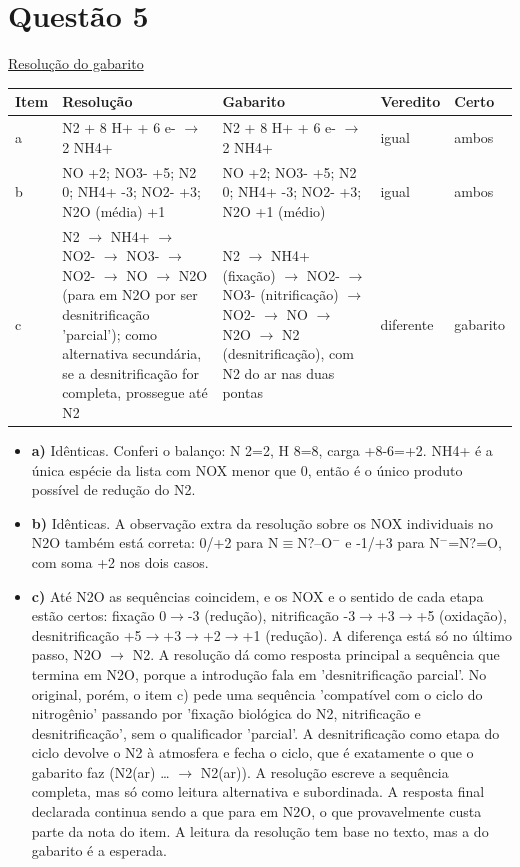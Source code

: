 \documentclass{article}%
\begin{document}
\section*{Questão 5}%
\href{https://poliedroresolve.sistemapoliedro.com.br/vestibulares/ita/2027/ita-2-fase-dia-2-21-10-2026-2-fase-dia-2/dissertativa-5-quimica-2-fase-dia-2-ita-2027}{Resolução do gabarito}\par\smallskip%
\begin{longtable}{@{}p{} p{} p{} p{} p{}@{}}\toprule Item & Resolução & Gabarito & Veredito & Certo \\ \midrule
a & N2 + 8 H+ + 6 e- $\to$ 2 NH4+ & N2 + 8 H+ + 6 e- $\to$ 2 NH4+ & igual & ambos \\
b & NO +2; NO3- +5; N2 0; NH4+ -3; NO2- +3; N2O (média) +1 & NO +2; NO3- +5; N2 0; NH4+ -3; NO2- +3; N2O +1 (médio) & igual & ambos \\
c & N2 $\to$ NH4+ $\to$ NO2- $\to$ NO3- $\to$ NO2- $\to$ NO $\to$ N2O (para em N2O por ser desnitrificação 'parcial'); como alternativa secundária, se a desnitrificação for completa, prossegue até N2 & N2 $\to$ NH4+ (fixação) $\to$ NO2- $\to$ NO3- (nitrificação) $\to$ NO2- $\to$ NO $\to$ N2O $\to$ N2 (desnitrificação), com N2 do ar nas duas pontas & diferente & gabarito \\
\bottomrule\end{longtable}%
\begin{itemize}%
\item%
\textbf{a)} Idênticas. Conferi o balanço: N 2=2, H 8=8, carga +8-6=+2. NH4+ é a única espécie da lista com NOX menor que 0, então é o único produto possível de redução do N2.%
\item%
\textbf{b)} Idênticas. A observação extra da resolução sobre os NOX individuais no N2O também está correta: 0/+2 para N$\equiv$N?--O$^{-}$ e -1/+3 para N$^{-}$=N?=O, com soma +2 nos dois casos.%
\item%
\textbf{c)} Até N2O as sequências coincidem, e os NOX e o sentido de cada etapa estão certos: fixação 0$\to$-3 (redução), nitrificação -3$\to$+3$\to$+5 (oxidação), desnitrificação +5$\to$+3$\to$+2$\to$+1 (redução). A diferença está só no último passo, N2O $\to$ N2. A resolução dá como resposta principal a sequência que termina em N2O, porque a introdução fala em 'desnitrificação parcial'. No original, porém, o item c) pede uma sequência 'compatível com o ciclo do nitrogênio' passando por 'fixação biológica do N2, nitrificação e desnitrificação', sem o qualificador 'parcial'. A desnitrificação como etapa do ciclo devolve o N2 à atmosfera e fecha o ciclo, que é exatamente o que o gabarito faz (N2(ar) \ldots{} $\to$ N2(ar)). A resolução escreve a sequência completa, mas só como leitura alternativa e subordinada. A resposta final declarada continua sendo a que para em N2O, o que provavelmente custa parte da nota do item. A leitura da resolução tem base no texto, mas a do gabarito é a esperada.%
\end{itemize}%
\end{document}
